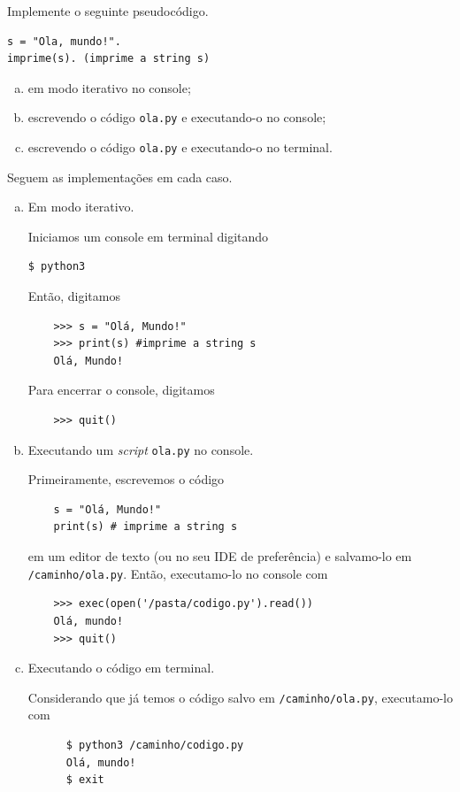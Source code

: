 \documentclass[12pt]{article}
\begin{document}
\begin{ex}
  Implemente o seguinte pseudocódigo.
\begin{verbatim}
s = "Ola, mundo!".
imprime(s). (imprime a string s)
\end{verbatim}
  \begin{enumerate}[a)]
  \item em modo iterativo no console;
  \item escrevendo o código \verb+ola.py+ e executando-o no console;
  \item escrevendo o código \verb+ola.py+ e executando-o no terminal.
  \end{enumerate}
  
   Seguem as implementações em cada caso.

  \begin{enumerate}[a)]
  \item Em modo iterativo.

    Iniciamos um console {\python} em terminal digitando
\begin{verbatim}
$ python3
\end{verbatim}
    Então, digitamos
    \begin{lstlisting}
    >>> s = "Olá, Mundo!"
    >>> print(s) #imprime a string s
    Olá, Mundo!
    \end{lstlisting}
    Para encerrar o console, digitamos
    \begin{lstlisting}
    >>> quit()
    \end{lstlisting}
    
  \item Executando um {\it script} \verb+ola.py+ no console.

    Primeiramente, escrevemos o código
    \begin{lstlisting}
    s = "Olá, Mundo!"
    print(s) # imprime a string s
    \end{lstlisting}
    em um editor de texto (ou no seu IDE de preferência) e salvamo-lo em \verb+/caminho/ola.py+. Então, executamo-lo no console {\python} com
    \begin{lstlisting}
    >>> exec(open('/pasta/codigo.py').read())
    Olá, mundo!
    >>> quit()
    \end{lstlisting}

  \item Executando o código em terminal.

    Considerando que já temos o código salvo em \verb+/caminho/ola.py+, executamo-lo com
    \begin{lstlisting}
      $ python3 /caminho/codigo.py
      Olá, mundo!
      $ exit
    \end{lstlisting}
  \end{enumerate}
\end{ex}
\end{document}
